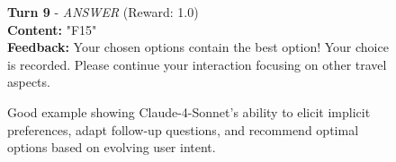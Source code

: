 \begin{figure}[t]
{\begin{tcolorbox}[colback=green!5!white, colframe=green!75!black, 
title=Good Example - Claude-4-Sonnet (Travel-444), boxrule=0.3mm, width=\textwidth, arc=3mm, auto outer arc=true]
\textbf{Turn 9} - \textit{ANSWER} (Reward: \textcolor{deepgreen}{1.0})\\
\textbf{Content:} "F15"\\
\textbf{Feedback:} Your chosen options contain the best option! Your choice is recorded. Please continue your interaction focusing on other travel aspects.\\

\end{tcolorbox}
}
\caption{Good example showing Claude-4-Sonnet's ability to elicit implicit preferences, adapt follow-up questions, and recommend optimal options based on evolving user intent.}
\label{fig:good_claude4}
\end{figure}


